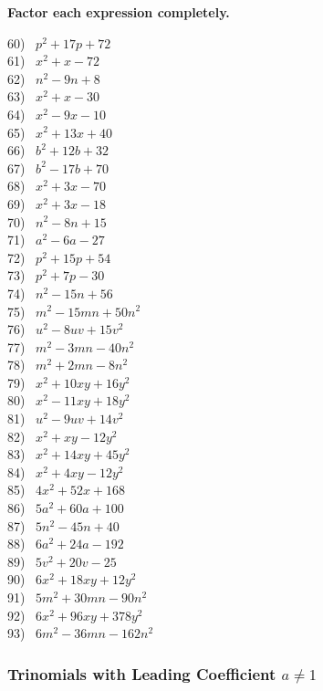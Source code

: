 \documentclass[12pt]{book}
\theoremstyle{definition}
\begin{document}
{\bf Factor each expression completely.}
\label{ais1}
\begin{multicols}{3}
  60)~ $p^2 + 17 p + 72$\\
  61)~ $x^2_{} + x - 72$\\
  62)~ $n^2 - 9 n + 8$\\
  63)~ $x^2 + x - 30$\\
  64)~ $x^2 - 9 x - 10$\\
  65)~ $x^2 + 13 x + 40$\\
  66)~ $b^2 + 12 b + 32$\\
  67)~ $b^2 - 17 b + 70$\\
  68)~ $x^2 + 3 x - 70$\\
  69)~ $x^2 + 3 x - 18$\\
  70)~ $n^2 - 8 n + 15$\\
  71)~ $a^2 - 6 a - 27$\\
  72)~ $p^2 + 15 p + 54$\\
  73)~ $p^2 + 7 p - 30$\\
  74)~ $n^2 - 15 n + 56$\\
  75)~ $m^2 - 15 m n + 50 n^2$\\
  76)~ $u^2 - 8 u v + 15 v^2$\\
  77)~ $m^2 - 3 m n - 40 n^2$\\
  78)~ $m^2 + 2 m n - 8 n^2$\\
  79)~ $x^2 + 10 x y + 16 y^2$\\
  80)~ $x^2 - 11 x y + 18 y^2$\\
  81)~ $u^2 - 9 u v + 14 v^2$\\
  82)~ $x^2 + x y - 12 y^2$\\
  83)~ $x^2 + 14 x y + 45 y^2$\\
  84)~ $x^2 + 4 x y - 12 y^2$\\
  85)~ $4 x^2 + 52 x + 168$\\
  86)~ $5 a^2 + 60 a + 100$\\
  87)~ $5 n^2 - 45 n + 40$\\
  88)~ $6 a^2 + 24 a - 192$\\
  89)~ $5 v^2 + 20 v - 25$\\
  90)~ $6 x^2_{} + 18 x y + 12 y^2$\\
  91)~ $5 m^2 + 30 m n - 90 n^2$\\
  92)~ $6 x^2 + 96 x y + 378 y^2$\\
  93)~ $6 m^2 - 36 m n - 162 n^2$
\end{multicols}

\subsubsection{Trinomials with Leading Coefficient $a\neq 1$}
\end{document}
